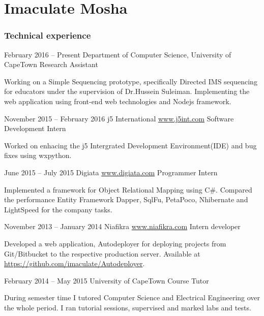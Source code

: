 \documentclass[fontsize=9pt]{tccv}
\begin{document}
\part{Imaculate Mosha}

\section{Technical experience}

\begin{eventlist}

\item{February 2016 -- Present}
	 {Department of Computer Science, University of CapeTown}
	 {Research Assistant}
	 
Working on a Simple Sequencing prototype, specifically Directed IMS sequencing for educators under the supervision of Dr.Hussein Suleiman.  
Implementing the web application using front-end web technologies and Nodejs framework. 


\item{November 2015 -- February 2016}
     {j5 International \url{www.j5int.com}}
     {Software Development Intern}

Worked on enhacing the j5 Intergrated Development Environment(IDE) and bug fixes using wxpython.

\item{June 2015 -- July 2015}
     {Digiata \url{www.digiata.com}}
     {Programmer Intern}

Implemented a framework for Object Relational Mapping using C\#.
Compared the performance Entity Framework Dapper, SqlFu, PetaPoco, Nhibernate and LightSpeed for the company tasks.

\item{November 2013 -- January 2014}
     {Niafikra \url{www.niafikra.com}}
     {Intern developer}

Developed a web application, Autodeployer for deploying projects from Git/Bitbucket to the respective
production server. Available at \url{https://github.com/imaculate/Autodeployer}.

\item{February 2014 -- May 2015}
     {University of CapeTown}
     {Course Tutor}

During semester time I tutored Computer Science and Electrical Engineering over the whole period. I ran tutorial sessions, supervised and marked labs and tests.

\end{eventlist}
\end{document}
